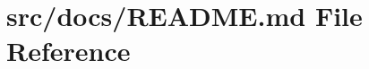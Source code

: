 \hypertarget{_r_e_a_d_m_e_8md}{}\section{src/docs/\+R\+E\+A\+D\+ME.md File Reference}
\label{_r_e_a_d_m_e_8md}
